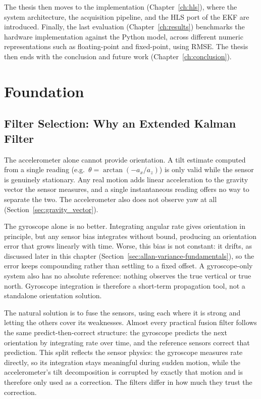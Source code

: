 \documentclass[12pt,a4paper]{article}
\begin{document}
The thesis then moves to the implementation
(Chapter~\ref{ch:hls}), where the system architecture, the
acquisition pipeline, and the HLS port of the EKF are introduced.
Finally, the last evaluation (Chapter~\ref{ch:results}) benchmarks
the hardware implementation against the Python model, across
different numeric representations such as floating-point and
fixed-point, using RMSE. The thesis then ends with the conclusion
and future work (Chapter~\ref{ch:conclusion}).

\newpage

\section{Foundation}
\label{ch:fundamentals}

\subsection{Filter Selection: Why an Extended Kalman Filter}
\label{sec:why-ekf}

The accelerometer alone cannot provide orientation. A tilt estimate
computed from a single reading (e.g.\ $\theta = \arctan(-a_x/a_z)$)
is only valid while the sensor is genuinely stationary. Any real
motion adds linear acceleration to the gravity vector the sensor
measures, and a single instantaneous reading offers no way to
separate the two. The accelerometer also does not observe yaw at
all (Section~\ref{sec:gravity_vector}).

The gyroscope alone is no better. Integrating angular rate gives
orientation in principle, but any sensor bias integrates without
bound, producing an orientation error that grows linearly with
time. Worse, this bias is not constant: it drifts, as discussed
later in this chapter
(Section~\ref{sec:allan-variance-fundamentals}), so the error keeps
compounding rather than settling to a fixed offset. A gyroscope-only
system also has no absolute reference: nothing observes the true
vertical or true north. Gyroscope integration is therefore a
short-term propagation tool, not a standalone orientation solution.

The natural solution is to fuse the sensors, using each where it is
strong and letting the others cover its weaknesses. Almost every
practical fusion filter follows the same predict-then-correct
structure: the gyroscope predicts the next orientation by
integrating rate over time, and the reference sensors correct that
prediction. This split reflects the sensor physics: the gyroscope
measures rate directly, so its integration stays meaningful during
sudden motion, while the accelerometer's tilt decomposition is
corrupted by exactly that motion and is therefore only used as a
correction. The filters differ in how much they trust the
correction.
\end{document}
